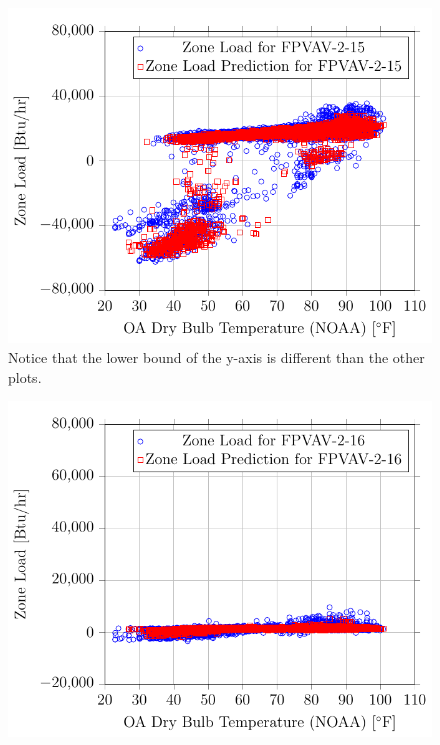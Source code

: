 \begin{figure}
\centering
\includegraphics{Plots/11/2017-06-27-1135-BtuhrvsOADryBulbTemperatureNOAAF.pdf}
\caption{ Notice that the lower
bound of the y-axis is different than the other plots.}
\label{fig:2017-06-27-1135-BtuhrvsOADryBulbTemperatureNOAAF}
\end{figure}

\begin{figure}
\centering
\includegraphics{Plots/12/2017-06-27-1138-BtuhrvsOADryBulbTemperatureNOAAF.pdf}
\caption{}
\label{fig:2017-06-27-1138-BtuhrvsOADryBulbTemperatureNOAAF}
\end{figure}


